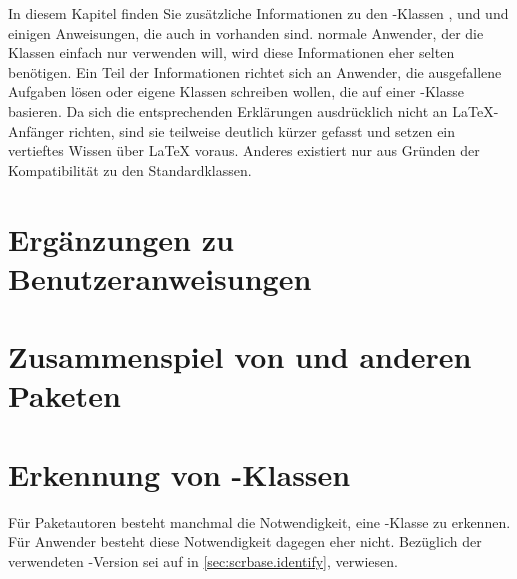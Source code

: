 \BeginIndexGroup%
%
%
%
%
In diesem Kapitel finden Sie zusätzliche Informationen zu den
\KOMAScript-Klassen ,  und  und
einigen Anweisungen, die auch in  vorhanden sind.
 normale Anwender, der die Klassen einfach nur verwenden will, wird
diese Informationen eher selten benötigen. Ein Teil der Informationen richtet
sich an Anwender, die ausgefallene Aufgaben lösen oder eigene Klassen
schreiben wollen, die auf einer \KOMAScript-Klasse basieren. Da sich die
entsprechenden Erklärungen ausdrücklich nicht an \LaTeX-Anfänger richten, sind
sie teilweise deutlich kürzer gefasst und setzen ein vertieftes Wissen über
\LaTeX{} voraus. Anderes existiert nur aus Gründen der Kompatibilität zu den
Standardklassen.


\section{Ergänzungen zu Benutzeranweisungen}



\section{Zusammenspiel von \KOMAScript{} und anderen Paketen}



\section{Erkennung von \KOMAScript-Klassen}

Für Paketautoren besteht manchmal die Notwendigkeit, eine \KOMAScript-Klasse
zu erkennen. Für Anwender besteht diese Notwendigkeit dagegen eher
nicht. Bezüglich der verwendeten \KOMAScript-Version sei auf
 in \autoref{sec:scrbase.identify},
 verwiesen.

